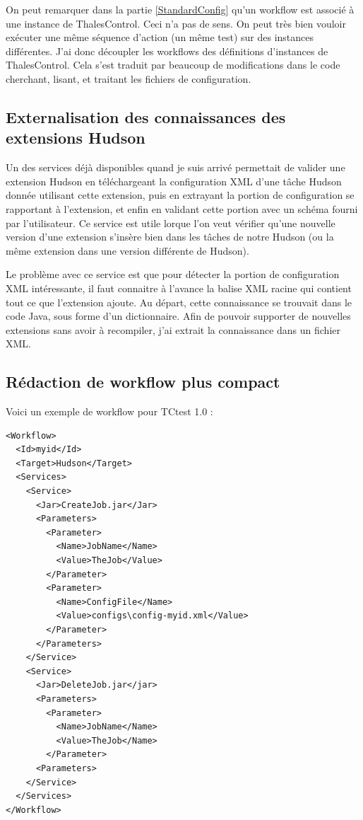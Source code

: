 On peut remarquer dans la partie \ref{StandardConfig} qu'un workflow est associé à une 
instance de ThalesControl. Ceci n'a pas de sens. On peut très bien vouloir 
exécuter une même séquence d'action (un même test) sur des instances 
différentes. J'ai donc découpler les workflows des définitions d'instances de 
ThalesControl. Cela s'est traduit par beaucoup de modifications dans le code 
cherchant, lisant, et traitant les fichiers de configuration.

\subsection{Externalisation des connaissances des extensions Hudson}

Un des services déjà disponibles quand je suis arrivé permettait de valider une
extension Hudson en téléchargeant la configuration XML d'une tâche Hudson donnée
utilisant cette extension, puis en extrayant la portion de configuration se 
rapportant à l'extension, et enfin en validant cette portion avec un schéma 
fourni par l'utilisateur. Ce service est utile lorque l'on veut vérifier 
qu'une nouvelle version d'une extension s'insère bien dans les tâches de notre 
Hudson (ou la même extension dans une version différente de Hudson).

Le problème avec ce service est que pour détecter la portion de configuration
XML intéressante, il faut connaitre à l'avance la balise XML racine qui contient
tout ce que l'extension ajoute. Au départ, cette connaissance se trouvait dans 
le code Java, sous forme d'un dictionnaire. Afin de pouvoir supporter de 
nouvelles extensions sans avoir à recompiler, j'ai extrait la connaissance dans 
un fichier XML.

\subsection{Rédaction de workflow plus compact}
\label{CompactWorkflow}

Voici un exemple de workflow pour TCtest 1.0 :

\begin{verbatim}
<Workflow>
  <Id>myid</Id>
  <Target>Hudson</Target>
  <Services>
    <Service>
      <Jar>CreateJob.jar</Jar>
      <Parameters>
        <Parameter>
          <Name>JobName</Name>
          <Value>TheJob</Value>
        </Parameter>
        <Parameter>
          <Name>ConfigFile</Name>
          <Value>configs\config-myid.xml</Value>
        </Parameter>
      </Parameters>
    </Service>
    <Service>
      <Jar>DeleteJob.jar</jar>
      <Parameters>
        <Parameter>
          <Name>JobName</Name>
          <Value>TheJob</Name>
        </Parameter>
      <Parameters>
    </Service>
  </Services>
</Workflow>
\end{verbatim}


